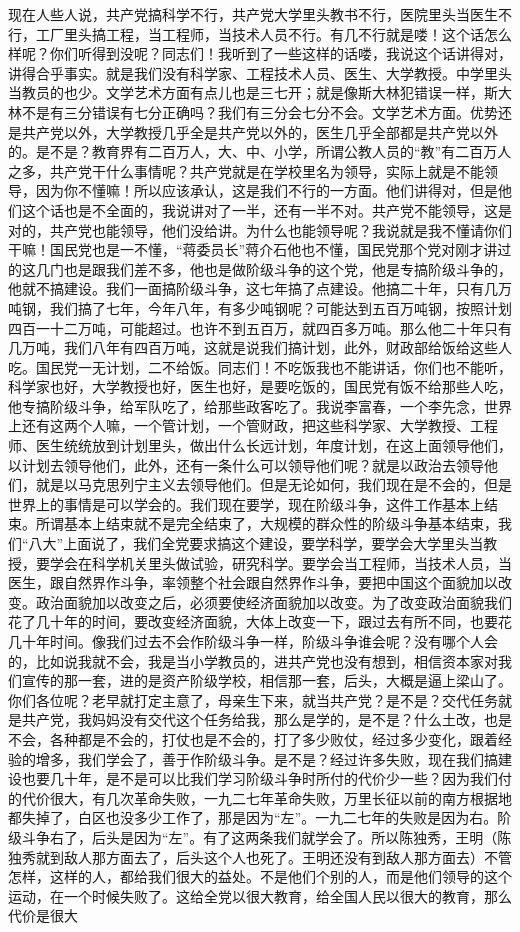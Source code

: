 现在人些人说，共产党搞科学不行，共产党大学里头教书不行，医院里头当医生不行，工厂里头搞工程，当工程师，当技术人员不行。有几不行就是喽！这个话怎么样呢？你们听得到没呢？同志们！我听到了一些这样的话喽，我说这个话讲得对，讲得合乎事实。就是我们没有科学家、工程技术人员、医生、大学教授。中学里头当教员的也少。文学艺术方面有点儿也是三七开；就是像斯大林犯错误一样，斯大林不是有三分错误有七分正确吗？我们有三分会七分不会。文学艺术方面。优势还是共产党以外，大学教授几乎全是共产党以外的，医生几乎全部都是共产党以外的。是不是？教育界有二百万人，大、中、小学，所谓公教人员的“教”有二百万人之多，共产党干什么事情呢？共产党就是在学校里名为领导，实际上就是不能领导，因为你不懂嘛！所以应该承认，这是我们不行的一方面。他们讲得对，但是他们这个话也是不全面的，我说讲对了一半，还有一半不对。共产党不能领导，这是对的，共产党也能领导，他们没给讲。为什么也能领导呢？我说就是我不懂请你们干嘛！国民党也是一不懂，“蒋委员长”蒋介石他也不懂，国民党那个党对刚才讲过的这几门也是跟我们差不多，他也是做阶级斗争的这个党，他是专搞阶级斗争的，他就不搞建设。我们一面搞阶级斗争，这七年搞了点建设。他搞二十年，只有几万吨钢，我们搞了七年，今年八年，有多少吨钢呢？可能达到五百万吨钢，按照计划四百一十二万吨，可能超过。也许不到五百万，就四百多万吨。那么他二十年只有几万吨，我们八年有四百万吨，这就是说我们搞计划，此外，财政部给饭给这些人吃。国民党一无计划，二不给饭。同志们！不吃饭我也不能讲话，你们也不能听，科学家也好，大学教授也好，医生也好，是要吃饭的，国民党有饭不给那些人吃，他专搞阶级斗争，给军队吃了，给那些政客吃了。我说李富春，一个李先念，世界上还有这两个人嘛，一个管计划，一个管财政，把这些科学家、大学教授、工程师、医生统统放到计划里头，做出什么长远计划，年度计划，在这上面领导他们，以计划去领导他们，此外，还有一条什么可以领导他们呢？就是以政治去领导他们，就是以马克思列宁主义去领导他们。但是无论如何，我们现在是不会的，但是世界上的事情是可以学会的。我们现在要学，现在阶级斗争，这件工作基本上结束。所谓基本上结束就不是完全结束了，大规模的群众性的阶级斗争基本结束，我们“八大”上面说了，我们全党要求搞这个建设，要学科学，要学会大学里头当教授，要学会在科学机关里头做试验，研究科学。要学会当工程师，当技术人员，当医生，跟自然界作斗争，率领整个社会跟自然界作斗争，要把中国这个面貌加以改变。政治面貌加以改变之后，必须要使经济面貌加以改变。为了改变政治面貌我们花了几十年的时间，要改变经济面貌，大体上改变一下，跟过去有所不同，也要花几十年时间。像我们过去不会作阶级斗争一样，阶级斗争谁会呢？没有哪个人会的，比如说我就不会，我是当小学教员的，进共产党也没有想到，相信资本家对我们宣传的那一套，进的是资产阶级学校，相信那一套，后头，大概是逼上梁山了。你们各位呢？老早就打定主意了，母亲生下来，就当共产党？是不是？交代任务就是共产党，我妈妈没有交代这个任务给我，那么是学的，是不是？什么土改，也是不会，各种都是不会的，打仗也是不会的，打了多少败仗，经过多少变化，跟着经验的增多，我们学会了，善于作阶级斗争。是不是？经过许多失败，现在我们搞建设也要几十年，是不是可以比我们学习阶级斗争时所付的代价少一些？因为我们付的代价很大，有几次革命失败，一九二七年革命失败，万里长征以前的南方根据地都失掉了，白区也没多少工作了，那是因为“左”。一九二七年的失败是因为右。阶级斗争右了，后头是因为“左”。有了这两条我们就学会了。所以陈独秀，王明（陈独秀就到敌人那方面去了，后头这个人也死了。王明还没有到敌人那方面去）不管怎样，这样的人，都给我们很大的益处。不是他们个别的人，而是他们领导的这个运动，在一个时候失败了。这给全党以很大教育，给全国人民以很大的教育，那么代价是很大